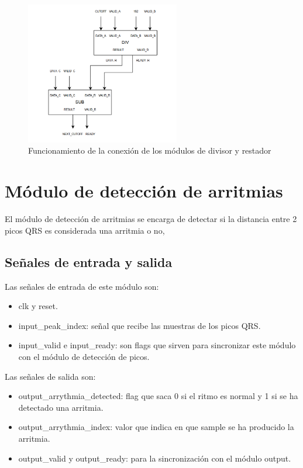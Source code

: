 \begin{figure}[h!]
    \centering
    \includegraphics[width=0.6\textwidth]{./Images/img_implementacion_hw/DiagramaDivisorrestador.png}
    \caption{Funcionamiento de la conexión de los módulos de divisor y restador}
    \label{fig:divisorrestador}
\end{figure}

\section{Módulo de detección de arritmias}

El módulo de detección de arritmias se encarga de detectar si la distancia entre 2 picos QRS es considerada una arritmia o no,
 
\subsection{Señales de entrada y salida}
Las señales de entrada de este módulo son:

\begin{itemize}
    \item clk y reset.
    \item input\_peak\_index: señal que recibe las muestras de los picos QRS.
    \item input\_valid e input\_ready: son flags que sirven para sincronizar este módulo con el módulo de detección de picos. 
\end{itemize}
    
Las señales de salida son:

\begin{itemize}
    \item output\_arrythmia\_detected: flag que saca 0 si el ritmo es normal y 1 si se ha detectado una arritmia.
    \item output\_arrythmia\_index: valor que indica en que sample se ha producido la arritmia.
    \item output\_valid y output\_ready: para la sincronización con el módulo output.
\end{itemize}

